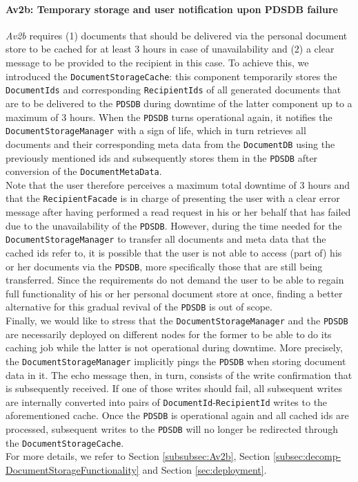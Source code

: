 \documentclass[a4paper,10pt]{article}
\begin{document}
\paragraph{Av2b: Temporary storage and user notification upon PDSDB failure}
\textit{Av2b} requires (1) documents that should be delivered via the personal document store to be cached for at least 3 hours in case of unavailability and (2) a clear message to be provided to the recipient in this case. To achieve this, we introduced the \texttt{DocumentStorageCache}: this component temporarily stores the \texttt{DocumentIds} and corresponding \texttt{RecipientIds} of all generated documents that are to be delivered to the \texttt{PDSDB} during downtime of the latter component up to a maximum of 3 hours. When the \texttt{PDSDB} turns operational again, it notifies the \texttt{DocumentStorageManager} with a sign of life, which in turn retrieves all documents and their corresponding meta data from the \texttt{DocumentDB} using the previously mentioned ids and subsequently stores them in the \texttt{PDSDB} after conversion of the \texttt{DocumentMetaData}.\\
Note that the user therefore perceives a maximum total downtime of 3 hours and that the \texttt{RecipientFacade} is in charge of presenting the user with a clear error message after having performed a read request in his or her behalf that has failed due to the unavailability of the \texttt{PDSDB}. However, during the time needed for the \texttt{DocumentStorageManager} to transfer all documents and meta data that the cached ids refer to, it is possible that the user is not able to access (part of) his or her documents via the \texttt{PDSDB}, more specifically those that are still being transferred. Since the requirements do not demand the user to be able to regain full functionality of his or her personal document store at once, finding a better alternative for this gradual revival of the \texttt{PDSDB} is out of scope.\\
Finally, we would like to stress that the \texttt{DocumentStorageManager} and the \texttt{PDSDB} are necessarily deployed on different nodes for the former to be able to do its caching job while the latter is not operational during downtime. More precisely, the \texttt{DocumentStorageManager} implicitly pings the \texttt{PDSDB} when storing document data in it. The echo message then, in turn, consists of the write confirmation that is subsequently received. If one of those writes should fail, all subsequent writes are internally converted into pairs of \texttt{DocumentId}-\texttt{RecipientId} writes to the aforementioned cache. Once the \texttt{PDSDB} is operational again and all cached ids are processed, subsequent writes to the \texttt{PDSDB} will no longer be redirected through the \texttt{DocumentStorageCache}.\\
For more details, we refer to Section \ref{subsubsec:Av2b}, Section \ref{subsec:decomp-DocumentStorageFunctionality} and Section \ref{sec:deployment}.
\end{document}
